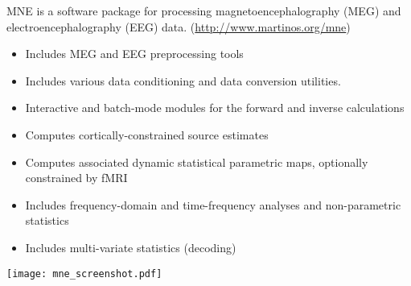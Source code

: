 \begin{multicols}{3}

MNE is a software package for processing magnetoencephalography (MEG) and electroencephalography (EEG) data.
(\url{http://www.martinos.org/mne})
\begin{itemize}[nolistsep,topsep=0em,leftmargin=1pc]
\item Includes MEG and EEG preprocessing tools
\item Includes various data conditioning and data conversion utilities.
\item Interactive and batch-mode modules for the forward and inverse calculations
\item Computes cortically-constrained source estimates
\item Computes associated dynamic statistical parametric maps, optionally constrained by fMRI
\item Includes frequency-domain and time-frequency analyses and non-parametric statistics
\item Includes multi-variate statistics (decoding)
\end{itemize}

\vspace{1em}
\texttt{[image: mne\_screenshot.pdf]}






\end{multicols}
